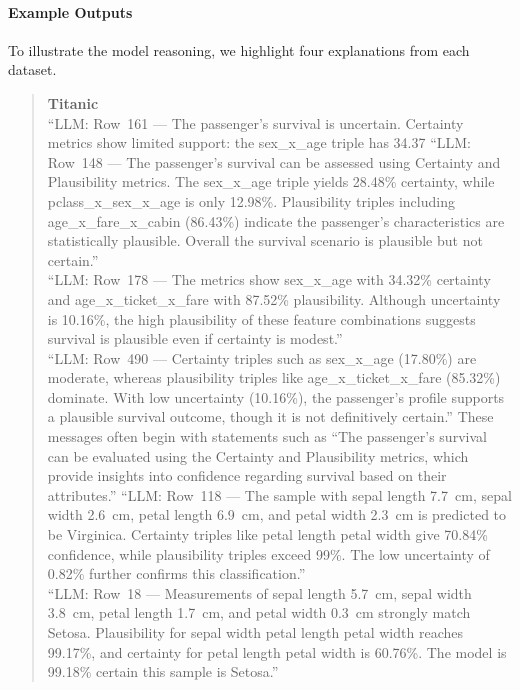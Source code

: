 \documentclass[acmlarge]{acmart}
\begin{document}
\paragraph{Example Outputs}
To illustrate the model reasoning, we highlight four explanations from each dataset.
\begin{quote}
\textbf{Titanic}\\

``LLM: Row~161 --- The passenger's survival is uncertain. Certainty metrics show limited support: the sex_x_age triple has 34.37%
``LLM: Row~148 --- The passenger's survival can be assessed using Certainty and Plausibility metrics. The sex\_x\_age triple yields 28.48\% certainty, while pclass\_x\_sex\_x\_age is only 12.98\%. Plausibility triples including age\_x\_fare\_x\_cabin (86.43\%) indicate the passenger's characteristics are statistically plausible. Overall the survival scenario is plausible but not certain.''\\
``LLM: Row~178 --- The metrics show sex\_x\_age with 34.32\% certainty and age\_x\_ticket\_x\_fare with 87.52\% plausibility. Although uncertainty is 10.16\%, the high plausibility of these feature combinations suggests survival is plausible even if certainty is modest.''\\
``LLM: Row~490 --- Certainty triples such as sex\_x\_age (17.80\%) are moderate, whereas plausibility triples like age\_x\_ticket\_x\_fare (85.32\%) dominate. With low uncertainty (10.16\%), the passenger's profile supports a plausible survival outcome, though it is not definitively certain.''
These messages often begin with statements such as ``The passenger's survival can be evaluated using the Certainty and Plausibility metrics, which provide insights into confidence regarding survival based on their attributes.''
``LLM: Row~118 --- The sample with sepal length 7.7~cm, sepal width 2.6~cm, petal length 6.9~cm, and petal width 2.3~cm is predicted to be Virginica. Certainty triples like petal length \times petal width give 70.84\% confidence, while plausibility triples exceed 99\%. The low uncertainty of 0.82\% further confirms this classification.''\\
``LLM: Row~18 --- Measurements of sepal length 5.7~cm, sepal width 3.8~cm, petal length 1.7~cm, and petal width 0.3~cm strongly match Setosa. Plausibility for sepal width \times petal length \times petal width reaches 99.17\%, and certainty for petal length \times petal width is 60.76\%. The model is 99.18\% certain this sample is Setosa.''\\

\end{quote}
\end{document}
